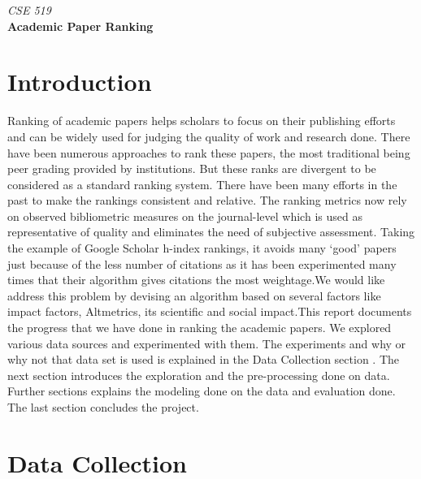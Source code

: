 \documentclass[a4paper, 11pt]{article}
\begin{document}
\noindent
\begin{center}
      \large\textit{CSE 519}\\
      \Large\textbf{Academic Paper Ranking}\\
\end{center}
\section*{Introduction}
Ranking of academic papers helps scholars to focus on their publishing efforts and can
be widely used for judging the quality of work and research done. There have been numerous approaches to rank these papers, the most traditional being peer grading provided by institutions. But these ranks are divergent to be considered as a standard ranking system. There have been many efforts in the past to make the rankings consistent and relative. The ranking metrics now rely on observed bibliometric measures on the journal-level which is used as representative of quality and eliminates the need of subjective assessment. Taking the example of Google Scholar h-index rankings, it avoids many ‘good’ papers just because of the less number of
citations as it has been experimented many times that their algorithm gives citations the most weightage.We would like address this problem by
devising an algorithm based on several factors like impact factors, Altmetrics, its
scientific and social impact.This report documents the progress that we have done in ranking the academic papers. We explored various data sources and experimented with them. The experiments and why or why not that data set is used is explained in the Data Collection section
. The next section introduces the exploration and the pre-processing done on data. Further sections explains the modeling done on the data and evaluation done. The last section concludes the project.

\section*{Data Collection}
\end{document}
